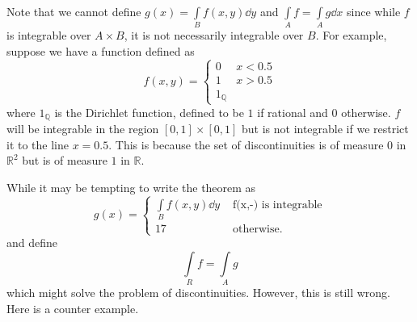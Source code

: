\documentclass{article}
\numberwithin{equation}{section}
\begin{document}
\begin{warning}
    Note that we cannot define $g(x) = \int\limits_{B} f(x,y) \dd{y}$ and $\int\limits_A f = \int\limits_A g \dd{x}$ since while $f$ is integrable over $A\times B$, it is not necessarily integrable over $B$. For example, suppose we have a function defined as
    \begin{equation}
        f(x,y) = \begin{cases}
            0 & x < 0.5 \\
            1 & x > 0.5 \\
            1_{\mathbb{Q}}
        \end{cases}
    \end{equation}
    where $1_{\mathbb{Q}}$ is the Dirichlet function, defined to be $1$ if rational and $0$ otherwise. $f$ will be integrable in the region $[0,1]\times [0,1]$ but is not integrable if we restrict it to the line $x=0.5.$ This is because the set of discontinuities is of measure $0$ in $\mathbb{R}^2$ but is of measure $1$ in $\mathbb{R}$.
\end{warning}
While it may be tempting to write the theorem as
\begin{equation}
    g(x) = \begin{cases}
        \int\limits_B f(x,y) \dd{y} & \text{ f(x,-) is integrable} \\
        17                          & \text{ otherwise}.
    \end{cases}
\end{equation}
and define
\begin{equation}
    \int\limits_R f = \int\limits_A g
\end{equation}
which might solve the problem of discontinuities. However, this is still wrong. Here is a counter example.
\end{document}
